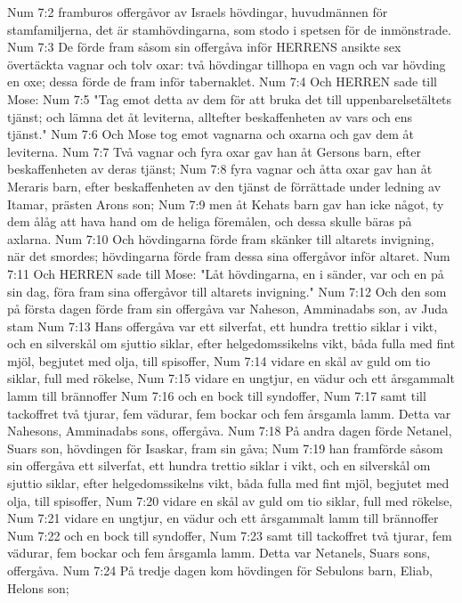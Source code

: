 Num 7:2  framburos offergåvor av Israels hövdingar, huvudmännen för stamfamiljerna, det är stamhövdingarna, som stodo i spetsen för de inmönstrade.
Num 7:3  De förde fram såsom sin offergåva inför HERRENS ansikte sex övertäckta vagnar och tolv oxar: två hövdingar tillhopa en vagn och var hövding en oxe; dessa förde de fram inför tabernaklet.
Num 7:4  Och HERREN sade till Mose:
Num 7:5  "Tag emot detta av dem för att bruka det till uppenbarelsetältets tjänst; och lämna det åt leviterna, alltefter beskaffenheten av vars och ens tjänst."
Num 7:6  Och Mose tog emot vagnarna och oxarna och gav dem åt leviterna.
Num 7:7  Två vagnar och fyra oxar gav han åt Gersons barn, efter beskaffenheten av deras tjänst;
Num 7:8  fyra vagnar och åtta oxar gav han åt Meraris barn, efter beskaffenheten av den tjänst de förrättade under ledning av Itamar, prästen Arons son;
Num 7:9  men åt Kehats barn gav han icke något, ty dem ålåg att hava hand om de heliga föremålen, och dessa skulle bäras på axlarna.
Num 7:10  Och hövdingarna förde fram skänker till altarets invigning, när det smordes; hövdingarna förde fram dessa sina offergåvor inför altaret.
Num 7:11  Och HERREN sade till Mose: "Låt hövdingarna, en i sänder, var och en på sin dag, föra fram sina offergåvor till altarets invigning."
Num 7:12  Och den som på första dagen förde fram sin offergåva var Naheson, Amminadabs son, av Juda stam
Num 7:13  Hans offergåva var ett silverfat, ett hundra trettio siklar i vikt, och en silverskål om sjuttio siklar, efter helgedomssikelns vikt, båda fulla med fint mjöl, begjutet med olja, till spisoffer,
Num 7:14  vidare en skål av guld om tio siklar, full med rökelse,
Num 7:15  vidare en ungtjur, en vädur och ett årsgammalt lamm till brännoffer
Num 7:16  och en bock till syndoffer,
Num 7:17  samt till tackoffret två tjurar, fem vädurar, fem bockar och fem årsgamla lamm. Detta var Nahesons, Amminadabs sons, offergåva.
Num 7:18  På andra dagen förde Netanel, Suars son, hövdingen för Isaskar, fram sin gåva;
Num 7:19  han framförde såsom sin offergåva ett silverfat, ett hundra trettio siklar i vikt, och en silverskål om sjuttio siklar, efter helgedomssikelns vikt, båda fulla med fint mjöl, begjutet med olja, till spisoffer,
Num 7:20  vidare en skål av guld om tio siklar, full med rökelse,
Num 7:21  vidare en ungtjur, en vädur och ett årsgammalt lamm till brännoffer
Num 7:22  och en bock till syndoffer,
Num 7:23  samt till tackoffret två tjurar, fem vädurar, fem bockar och fem årsgamla lamm. Detta var Netanels, Suars sons, offergåva.
Num 7:24  På tredje dagen kom hövdingen för Sebulons barn, Eliab, Helons son;
